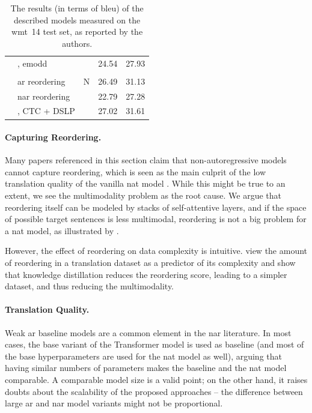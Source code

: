 \begin{table}
\begin{adjustbox}{totalheight=\baselineskip}
\begin{tabular}{cl>{\ignorecolumn}r@{}cc}
    & \citet{sun2020em}, \acs{emodd} & \JH{??} & 24.54 & 27.93 \\

    & \citet{ran-etal-2021-guiding} & & &  \\
    & \quad \acs{ar} reordering & N & 26.49 & 31.13  \\
    & \quad \acs{nar} reordering & 1\footnotemark\JH{..} & 22.79 & 27.28 \\

    & \citet{huang-etal-2021-nonautoregressive}, CTC + DSLP &\JH{?} & 27.02  &  31.61 \\
    \bottomrule
  \end{tabular}
  \end{adjustbox}
  \caption{The results (in terms of \acs{bleu}) of the described models
    measured on the \acs{wmt}~14 test set, as reported by the authors.}%
  \label{tab:related:wmt14}
\end{table}

\paragraph{Capturing Reordering.} Many papers referenced in this section claim
that non-autoregressive models cannot capture reordering, which is seen as the
main culprit of the low translation quality of the vanilla \acs{nat} model
\citep{gu-kong-2021-fully, ran-etal-2021-guiding}.  While this might be true to
an extent, we see the multimodality problem as the root cause.  We argue that
reordering itself can be modeled by stacks of self-attentive layers, and if the
space of possible target sentences is less multimodal, reordering is not a big
problem for a \acs{nat} model, as illustrated by \citet{du2021orderagnostic}.

However, the effect of reordering on data complexity is intuitive.
\citet{zhou-etal-2020-understanding} view the amount of reordering in a
translation dataset as a predictor of its complexity and show that knowledge
distillation reduces the reordering score, leading to a simpler dataset, and
thus reducing the multimodality.

\paragraph{Translation Quality.} Weak \acl{ar} baseline models are a common
element in the \acl{nar} literature. In most cases, the base variant of the
Transformer model is used as baseline (and most of the base hyperparameters are
used for the \ac{nat} model as well), arguing that having similar numbers of
parameters makes the baseline and the \ac{nat} model comparable. A comparable
model size is a valid point; on the other hand, it raises doubts about the
scalability of the proposed approaches -- the difference between large \ac{ar}
and \ac{nar} model variants might not be proportional.

